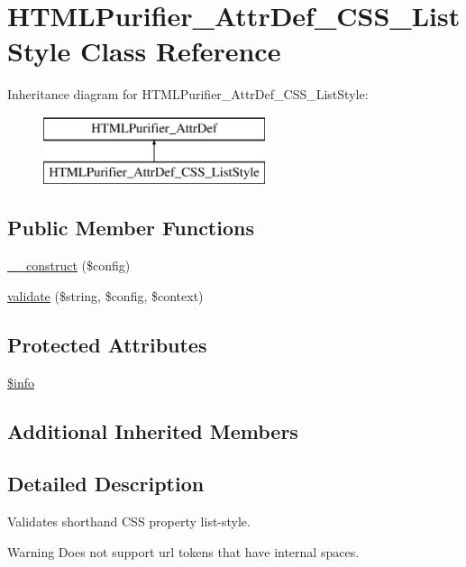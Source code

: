 \hypertarget{classHTMLPurifier__AttrDef__CSS__ListStyle}{\section{H\+T\+M\+L\+Purifier\+\_\+\+Attr\+Def\+\_\+\+C\+S\+S\+\_\+\+List\+Style Class Reference}
\label{classHTMLPurifier__AttrDef__CSS__ListStyle}
}
Inheritance diagram for H\+T\+M\+L\+Purifier\+\_\+\+Attr\+Def\+\_\+\+C\+S\+S\+\_\+\+List\+Style\+:\begin{figure}[H]
\begin{center}
\leavevmode
\includegraphics[height=2.000000cm]{classHTMLPurifier__AttrDef__CSS__ListStyle}
\end{center}
\end{figure}
\subsection*{Public Member Functions}
\begin{DoxyCompactItemize}
\item 
\hyperlink{classHTMLPurifier__AttrDef__CSS__ListStyle_a072fe9061a70b36b9e82ac3d6bf02647}{\+\_\+\+\_\+construct} (\$config)
\item 
\hyperlink{classHTMLPurifier__AttrDef__CSS__ListStyle_a7f8390636297da07df77965be3bc4bc1}{validate} (\$string, \$config, \$context)
\end{DoxyCompactItemize}
\subsection*{Protected Attributes}
\begin{DoxyCompactItemize}
\item 
\hyperlink{classHTMLPurifier__AttrDef__CSS__ListStyle_ab3f5f0e24f511e97940de1af26a6eaba}{\$info}
\end{DoxyCompactItemize}
\subsection*{Additional Inherited Members}


\subsection{Detailed Description}
Validates shorthand C\+S\+S property list-\/style. \begin{DoxyWarning}{Warning}
Does not support url tokens that have internal spaces. 
\end{DoxyWarning}


